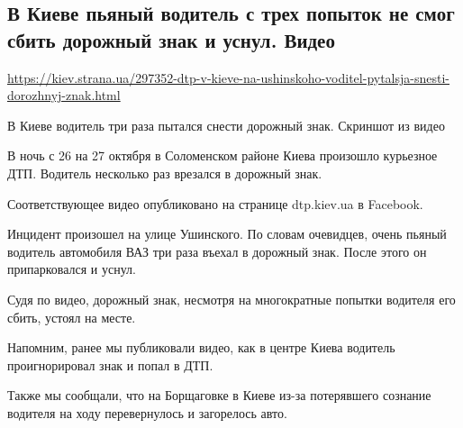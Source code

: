  
 

\subsection{В Киеве пьяный водитель с трех попыток не смог сбить дорожный знак и уснул. Видео}

\url{https://kiev.strana.ua/297352-dtp-v-kieve-na-ushinskoho-voditel-pytalsja-snesti-dorozhnyj-znak.html}

В Киеве водитель три раза пытался снести дорожный знак. Скриншот из видео

В ночь с 26 на 27 октября в Соломенском районе Киева произошло курьезное ДТП.
Водитель несколько раз врезался в дорожный знак. 

Соответствующее видео опубликовано на странице dtp.kiev.ua в Facebook.

Инцидент произошел на улице Ушинского. По словам очевидцев, очень пьяный
водитель автомобиля ВАЗ три раза въехал в дорожный знак. После этого он
припарковался и уснул. 

Судя по видео, дорожный знак, несмотря на многократные попытки водителя его
сбить, устоял на месте.

Напомним, ранее мы публиковали видео, как в центре Киева водитель
проигнорировал знак и попал в ДТП.

Также мы сообщали, что на Борщаговке в Киеве из-за потерявшего сознание
водителя на ходу перевернулось и загорелось авто.
